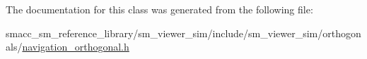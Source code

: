 The documentation for this class was generated from the following file\+:\begin{DoxyCompactItemize}
\item 
smacc\+\_\+sm\+\_\+reference\+\_\+library/sm\+\_\+viewer\+\_\+sim/include/sm\+\_\+viewer\+\_\+sim/orthogonals/\hyperlink{smacc__sm__reference__library_2sm__viewer__sim_2include_2sm__viewer__sim_2orthogonals_2navigation__orthogonal_8h}{navigation\+\_\+orthogonal.\+h}\end{DoxyCompactItemize}
